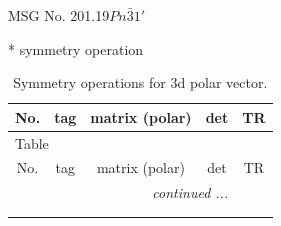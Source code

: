 \documentclass[fleqn,8pt]{jsarticle}
\begin{document}
\setcounter{MaxMatrixCols}{32}

\renewcommand{\tablename}{Table~}
\renewcommand{\figurename}{Figure~}
\begin{center}
\LARGE
MSG No. 201.19\quad$Pn\bar{3}1'$
\end{center}
* symmetry operation
\renewcommand{\arraystretch}{1.3}
\begin{longtable}{ccccc}
\caption{Symmetry operations for 3d polar vector.}
 \\
 \hline \hline
No. & tag & matrix (polar) & det & TR \\ \hline \endfirsthead

\multicolumn{4}{l}{\tablename\ \thetable{}} \\
 \hline \hline
No. & tag & matrix (polar) & det & TR \\ \hline \endhead

 \hline \hline
\multicolumn{4}{r}{\footnotesize\it continued ...} \\ \endfoot

 \hline \hline
\multicolumn{4}{r}{} \\ \endlastfoot


\end{longtable}
\end{document}
